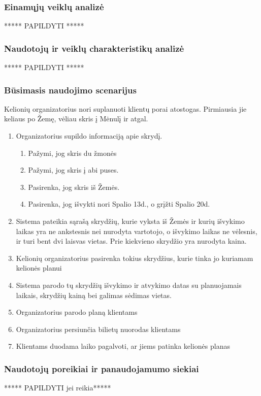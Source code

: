 \documentclass{VUMIFPSkursinis}
\begin{document}
\subsubsection{Einamųjų veiklų analizė}
\centerline{***** PAPILDYTI *****}

\subsubsection{Naudotojų ir veiklų charakteristikų analizė}
\centerline{***** PAPILDYTI *****}

\subsubsection{Būsimasis naudojimo scenarijus}
Kelionių organizatorius nori suplanuoti klientų porai atostogas. Pirmiausia jie keliaus po Žemę, vėliau skris į Mėnulį ir atgal.
\begin{enumerate}
\item  Organizatorius supildo informaciją apie skrydį.
\begin{enumerate}[label*=\arabic*.]
\item Pažymi, jog skris du žmonės
\item Pažymi, jog skris į abi puses.
\item Pasirenka, jog skris iš Žemės.
\item  Pasirenka, jog išvykti nori Spalio 13d., o grįžti Spalio 20d.
\end{enumerate}
\item  Sistema pateikia sąrašą skrydžių, kurie vyksta iš Žemės ir kurių išvykimo laikas yra ne ankstesnis nei nurodyta vartotojo, o išvykimo laikas ne vėlesnis, ir turi bent dvi laisvas vietas. Prie kiekvieno skrydžio yra nurodyta kaina.
\item Kelionių organizatorius pasirenka tokius skrydžius, kurie tinka jo kuriamam kelionės planui
\item Sistema parodo tų skrydžių išvykimo ir atvykimo datas su planuojamais laikais, skrydžių kainą bei galimas sėdimas vietas.
\item Organizatorius parodo planą klientams
\item Organizatorius persiunčia bilietų nuorodas klientams
\item Klientams duodama laiko pagalvoti, ar jiems patinka kelionės planas
\end{enumerate}

\subsubsection{Naudotojų poreikiai ir panaudojamumo siekiai}
\centerline{***** PAPILDYTI jei reikia*****}


\printbibliography[heading=bibintoc, title=Šaltiniai]  %
\end{document}
